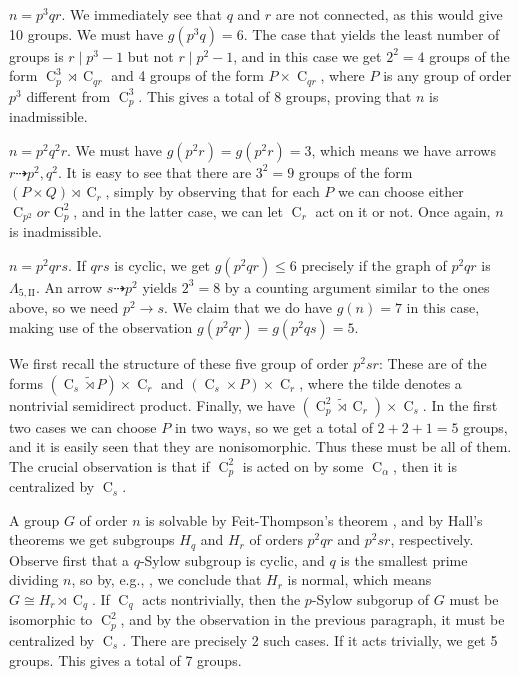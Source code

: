 \documentclass{article}
\newcommand{\cyc}[1]{\operatorname{C}_{#1}}
\newcommand{\qlamz}{\Lambda_{5,\text{II}}}
\theoremstyle{plain}
\theoremstyle{definition}
\begin{document}
 $n = p^3 q r$.
We immediately see that $q$ and $r$ are not connected, as this would give 10 groups. We must have $g(p^3 q) = 6$. The case that yields the least number of groups is $r \mid p^3 - 1$ but not $r \mid p^2 - 1$, and in this case we get $2^2 = 4$ groups of the form $\cyc{p}^3 \rtimes \cyc{qr}$ and 4 groups of the form $P \times \cyc{qr}$, where $P$ is any group of order $p^3$ different from $\cyc{p}^3$. This gives a total of 8 groups, proving that $n$ is inadmissible.

 $n = p^2 q^2 r$.
We must have $g(p^2 r) = g(p^2 r) = 3$, which means we have arrows $r \dashrightarrow p^2, q^2$. It is easy to see that there are $3^2 = 9$ groups of the form $(P \times Q) \rtimes \cyc{r}$, simply by observing that for each $P$ we can choose either $\cyc{p^2} or \cyc{p}^2$, and in the latter case, we can let $\cyc{r}$ act on it or not. Once again, $n$ is inadmissible.
 
 $n = p^2 q r s$.
If $qrs$ is cyclic, we get $g(p^2 q r) \le 6$ precisely if the graph of $p^2 q r$ is $\qlamz$. An arrow $s \dashrightarrow p^2$ yields $2^3 = 8$ by a counting argument similar to the ones above, so we need $p^2 \rightarrow s$. We claim that we do have $g(n) = 7$ in this case, making use of the observation $g(p^2 q r) = g(p^2 q s) = 5$.

We first recall the structure of these five group of order $p^2 s r$: These are of the forms $(\cyc{s} \tilde{\rtimes} P) \times \cyc{r}$ and $(\cyc{s} \times P) \times \cyc{r}$, where the tilde denotes a nontrivial semidirect product. Finally, we have $(\cyc{p}^2 \tilde{\rtimes} \cyc{r}) \times \cyc{s}$. In the first two cases we can choose $P$ in two ways, so we get a total of $2 + 2 + 1 = 5$ groups, and it is easily seen that they are nonisomorphic. Thus these must be all of them. The crucial observation is that if $\cyc{p}^2$ is acted on by some $\cyc{\alpha}$, then it is centralized by $\cyc{s}$.

A group $G$ of order $n$ is solvable by Feit-Thompson's theorem {\cite{oddsolve}}, and by Hall's theorems {\cite[Th.~3.13]{fgt}} we get subgroups $H_q$ and $H_r$ of orders $p^2 q r$ and $p^2 s r$, respectively. Observe first that a $q$-Sylow subgroup is cyclic, and $q$ is the smallest prime dividing $n$, so by, e.g., {\cite[Th.~5.14]{fgt}}, we conclude that $H_r$ is normal, which means $G \cong H_r \rtimes \cyc{q}$. If $\cyc{q}$ acts nontrivially, then the $p$-Sylow subgorup of $G$ must be isomorphic to $\cyc{p}^2$, and by the observation in the previous paragraph, it must be centralized by $\cyc{s}$. There are precisely 2 such cases. If it acts trivially, we get 5 groups. This gives a total of 7 groups.
\end{document}
